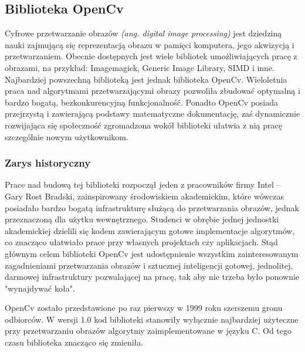 \documentclass[a4paper,12pt]{article}
\newcommand\spacingIndent{2.2em}
\begin{document}
		\subsection{Biblioteka OpenCv}
		\hspace{\spacingIndent} Cyfrowe przetwarzanie obrazów \textit{(ang. digital image processing)} jest dziedziną nauki 
			zajmującą się reprezentacją obrazu w pamięci komputera, jego akwizycją i przetwarzaniem. 
         Obecnie dostępnych jest wiele bibliotek umożliwiających pracę z obrazami, na przykład: Imagemagick, Generic Image Library, SIMD i inne. 
			Najbardziej powszechną biblioteką jest jednak biblioteka OpenCv. Wieloletnia praca nad algorytmami przetwarzającymi obrazy pozwoliła zbudować optymalną i bardzo bogatą, bezkonkurencyjną funkcjonalność.
			Ponadto OpenCv posiada przejrzystą 
			i zawierającą podstawy matematyczne dokumentację, zaś dynamicznie rozwijająca się społeczność zgromadzona wokół biblioteki ułatwia 
			z nią pracę szczególnie nowym użytkownikom.
		\subsubsection{Zarys historyczny}
			\hspace{\spacingIndent} Prace nad budową tej biblioteki rozpoczął jeden z pracowników firmy Intel -- Gary Rost Bradski, 
				zainspirowany środowiskiem akademickim, które wówczas posiadało bardzo bogatą infrastrukturę służącą do przetwarzania obrazów, 
				jednak przeznaczoną dla użytku wewnętrznego. Studenci w obrębie jednej jednostki akademickiej dzielili się kodem zawierającym gotowe 
				implementacje algorytmów, co znacząco ułatwiało prace przy własnych projektach czy aplikacjach. Stąd głównym celem biblioteki OpenCv 
				jest udostępnienie wszystkim zainteresowanym zagadnieniami przetwarzania obrazów i sztucznej inteligencji gotowej, jednolitej, 
				darmowej infrastruktury pozwalającej na pracę, tak aby nie trzeba było ponownie "wynajdywać koła".
				
			OpenCv zostało przedstawione po raz pierwszy w 1999 roku szerszemu gronu odbiorców.  W wersji 1.0 kod biblioteki stanowiły wyłącznie najbardziej użyteczne przy przetwarzaniu obrazów algorytmy zaimplementowane w języku C. 
				Od tego czasu biblioteka znacząco się zmieniła. 
			
\end{document}
